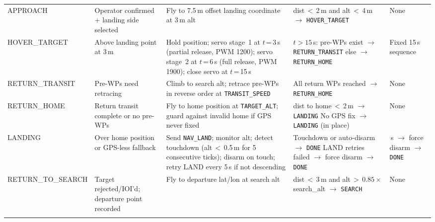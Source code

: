 \begin{small}
\begin{longtable}{
  @{}
  >{\ttfamily\raggedright}p{2.6cm}
  p{3.0cm}
  p{3.2cm}
  p{3.8cm}
  >{\raggedright\arraybackslash}p{2.2cm}
  @{}
}
\addlinespace
\midrule
\addlinespace

APPROACH &
  Operator confirmed + landing side selected &
  Fly to 7.5\,m offset landing coordinate at 3\,m alt &
  dist\,$<$\,2\,m and alt\,$<$\,4\,m $\to$ \texttt{HOVER\_TARGET} &
  None \\
\addlinespace

HOVER\_TARGET &
  Above landing point at 3\,m &
  Hold position; servo stage~1 at $t$\,=\,3\,s (partial release, PWM 1200); servo stage~2 at $t$\,=\,6\,s (full release, PWM 1900); close servo at $t$\,=\,15\,s &
  $t > 15$\,s: \newline
  \quad pre-WPs exist $\to$ \texttt{RETURN\_TRANSIT} \newline
  \quad else $\to$ \texttt{RETURN\_HOME} &
  Fixed 15\,s sequence \\

\addlinespace
\midrule
\addlinespace

RETURN\_TRANSIT &
  Pre-WPs need retracing &
  Climb to search alt; retrace pre-WPs in reverse order at \texttt{TRANSIT\_SPEED} &
  All return WPs reached $\to$ \texttt{RETURN\_HOME} &
  None \\
\addlinespace

RETURN\_HOME &
  Return transit complete or no pre-WPs &
  Fly to home position at \texttt{TARGET\_ALT}; guard against invalid home if GPS never fixed &
  dist to home\,$<$\,2\,m $\to$ \texttt{LANDING} \newline
  No GPS fix $\to$ \texttt{LANDING} (in place) &
  None \\
\addlinespace

LANDING &
  Over home position or GPS-less fallback &
  Send \texttt{NAV\_LAND}; monitor alt; detect touchdown (alt\,$<$\,0.5\,m for 5 consecutive ticks); disarm on touch; retry LAND every 5\,s if not descending &
  Touchdown or auto-disarm $\to$ \texttt{DONE} \newline
  5 LAND retries failed $\to$ force disarm $\to$ \texttt{DONE} &
  90\,s $\to$ force disarm $\to$ \texttt{DONE} \\

\addlinespace
\midrule
\addlinespace

RETURN\_TO\_SEARCH &
  Target rejected/IOI'd; departure point recorded &
  Fly to departure lat/lon at search alt &
  dist\,$<$\,3\,m and alt\,$>$\,$0.85\times$search\_alt $\to$ \texttt{SEARCH} &
  None \\
\addlinespace


\end{longtable}
\end{small}
